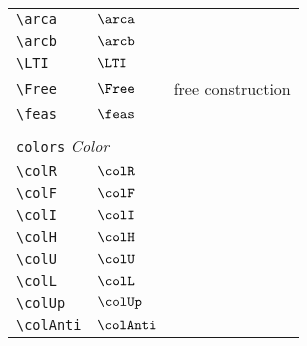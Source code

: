 \begin{longtable}{lll}
  {\color[rgb]{0.5,0.5,0.5}\texttt{\textbackslash arca}}                                                    & $\arca$                    & \\
  {\color[rgb]{0.5,0.5,0.5}\texttt{\textbackslash arcb}}                                                    & $\arcb$                    & \\
  {\color[rgb]{0.5,0.5,0.5}\texttt{\textbackslash LTI}}                                                     & $\LTI$                     & \\
  {\color[rgb]{0.5,0.5,0.5}\texttt{\textbackslash Free}}                                                    & $\Free$                    & free construction\\
  {\color[rgb]{0.5,0.5,0.5}\texttt{\textbackslash feas}}                                                    & $\feas$                    &                                                         \\
  &                            &                                                         \\
  \multicolumn{3}{l}{{\color[rgb]{0.5,0.5,0.5}\texttt{colors}} \emph{Color}} \\
  \hline
  \hline
  {\color[rgb]{0.5,0.5,0.5}\texttt{\textbackslash colR}}                                                    & $\colR$                    & \\
  {\color[rgb]{0.5,0.5,0.5}\texttt{\textbackslash colF}}                                                    & $\colF$                    & \\
  {\color[rgb]{0.5,0.5,0.5}\texttt{\textbackslash colI}}                                                    & $\colI$                    & \\
  {\color[rgb]{0.5,0.5,0.5}\texttt{\textbackslash colH}}                                                    & $\colH$                    & \\
  {\color[rgb]{0.5,0.5,0.5}\texttt{\textbackslash colU}}                                                    & $\colU$                    & \\
  {\color[rgb]{0.5,0.5,0.5}\texttt{\textbackslash colL}}                                                    & $\colL$                    & \\
  {\color[rgb]{0.5,0.5,0.5}\texttt{\textbackslash colUp}}                                                   & $\colUp$                   & \\
  {\color[rgb]{0.5,0.5,0.5}\texttt{\textbackslash colAnti}}                                                 & $\colAnti$                 & \\

\end{longtable}
